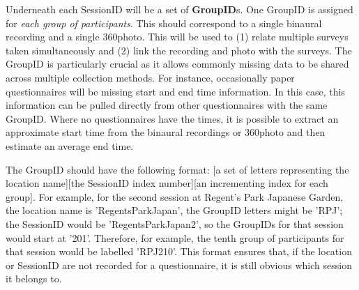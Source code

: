    Underneath each SessionID will be a set of \textbf{GroupID}s. One GroupID is assigned for \emph{each group of participants}. This should correspond to a single binaural recording and a single 360\degree photo. This will be used to (1) relate multiple surveys taken simultaneously and (2) link the recording and photo with the surveys. The GroupID is particularly crucial as it allows commonly missing data to be shared across multiple collection methods. For instance, occasionally paper questionnaires will be missing start and end time information. In this case, this information can be pulled directly from other questionnaires with the same GroupID. Where no questionnaires have the times, it is possible to extract an approximate start time from the binaural recordings or 360\degree photo and then estimate an average end time.

   The GroupID should have the following format: [a set of letters representing the location name][the SessionID index number][an incrementing index for each group]. For example, for the second session at Regent's Park Japanese Garden, the location name is 'RegentsParkJapan', the GroupID letters might be 'RPJ'; the SessionID would be 'RegentsParkJapan2', so the GroupIDs for that session would start at '201'. Therefore, for example, the tenth group of participants for that session would be labelled 'RPJ210'. This format ensures that, if the location or SessionID are not recorded for a questionnaire, it is still obvious which session it belongs to.

